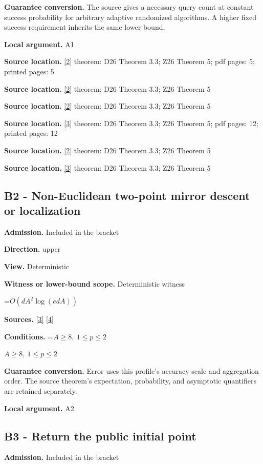 \documentclass[10pt,a4paper]{article}
\newcommand{\AtlasMath}[1]{\par\begingroup\centering\setbox0=\hbox{$\displaystyle #1$}\ifdim\wd0>1.4\linewidth\typeout{ATLAS WIDE FORMULA: \the\wd0}\fi\ifdim\wd0>\linewidth\resizebox{\linewidth}{!}{\box0}\else\box0\fi\par\endgroup}
\newcommand{\AtlasInlineMath}[1]{\begingroup\setbox0=\hbox{$#1$}\ifdim\wd0>.4\linewidth\endgroup\AtlasMath{#1}\else\endgroup$#1$\fi}
\begin{document}
\textbf{Guarantee conversion.} The source gives a necessary query count at constant success probability for arbitrary adaptive randomized algorithms. A higher fixed success requirement inherits the same lower bound.

\textbf{Local argument.} A1

\textbf{Source location.} \href{https://arxiv.org/html/2610.00345v1}{[2]} theorem: D26 Theorem 3.3; Z26 Theorem 5; pdf pages: 5; printed pages: 5

\textbf{Source location.} \href{https://arxiv.org/html/2610.00345v1}{[2]} theorem: D26 Theorem 3.3; Z26 Theorem 5

\textbf{Source location.} \href{https://arxiv.org/html/2610.00345v1}{[2]} theorem: D26 Theorem 3.3; Z26 Theorem 5

\textbf{Source location.} \href{https://arxiv.org/html/2607.16558v2}{[3]} theorem: D26 Theorem 3.3; Z26 Theorem 5; pdf pages: 12; printed pages: 12

\textbf{Source location.} \href{https://arxiv.org/html/2610.00345v1}{[2]} theorem: D26 Theorem 3.3; Z26 Theorem 5

\textbf{Source location.} \href{https://arxiv.org/html/2607.16558v2}{[3]} theorem: D26 Theorem 3.3; Z26 Theorem 5

\subsection{B2 - Non-Euclidean two-point mirror descent or localization}
\textbf{Admission.} Included in the bracket

\textbf{Direction.} upper

\textbf{View.} Deterministic

\textbf{Witness or lower-bound scope.} Deterministic witness

\AtlasMath{O(dA^2\log(edA))}
\textbf{Sources.} \href{https://arxiv.org/html/2607.16558v2}{[3]} \href{https://www.mathnet.ru/php/archive.phtml?jrnid=mzm&option_lang=eng&paperid=1697&wshow=paper}{[4]}

\textbf{Conditions.} \AtlasInlineMath{A\ge8,\ 1\le p\le2}

\textbf{Guarantee conversion.} Error uses this profile's accuracy scale and aggregation order. The source theorem's expectation, probability, and asymptotic quantifiers are retained separately.

\textbf{Local argument.} A2

\subsection{B3 - Return the public initial point}
\textbf{Admission.} Included in the bracket
\end{document}
